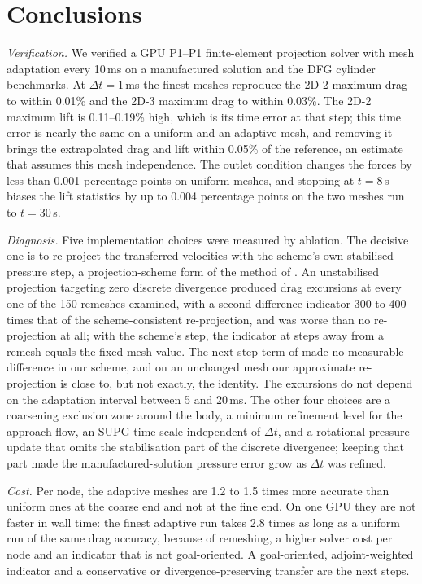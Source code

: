 \documentclass[preprint,12pt,number]{elsarticle}
\newcommand{\dt}{\Delta t}
\begin{document}
\section{Conclusions}
\label{sec:conclusions}

\emph{Verification.} We verified a GPU P1--P1 finite-element projection solver with mesh
adaptation every 10\,ms on a manufactured solution and the DFG cylinder benchmarks. At
$\dt = 1\,$ms the finest meshes reproduce the 2D-2 maximum drag to within 0.01\% and the 2D-3
maximum drag to within 0.03\%. The 2D-2 maximum lift is 0.11--0.19\% high, which is its time
error at that step; this time error is nearly the same on a uniform and an adaptive mesh, and
removing it brings the extrapolated drag and lift within 0.05\% of the reference, an estimate
that assumes this mesh independence. The outlet condition changes the forces by less than
0.001 percentage points on uniform meshes, and stopping at $t = 8\,$s biases the lift
statistics by up to 0.004 percentage points on the two meshes run to $t = 30\,$s.

\emph{Diagnosis.} Five implementation choices were measured by ablation. The decisive one is to
re-project the transferred velocities with the scheme's own stabilised pressure step, a
projection-scheme form of the method of \citet{braack2013}. An unstabilised projection
targeting zero discrete divergence produced drag excursions at every one of the 150 remeshes
examined, with a second-difference indicator 300 to 400 times that of the scheme-consistent
re-projection, and was worse than no re-projection at all; with the scheme's step, the indicator
at steps away from a remesh equals the fixed-mesh value. The next-step term of
\citet{braack2013} made no measurable difference in our scheme, and on an unchanged mesh our
approximate re-projection is close to, but not exactly, the identity. The excursions do not
depend on the adaptation interval between 5 and 20\,ms. The other four choices are a
coarsening exclusion zone around the body, a minimum refinement level for the approach flow, an
SUPG time scale independent of $\dt$, and a rotational pressure update that omits the
stabilisation part of the discrete divergence; keeping that part made the manufactured-solution
pressure error grow as $\dt$ was refined.

\emph{Cost.} Per node, the adaptive meshes are 1.2 to 1.5 times more accurate than uniform ones
at the coarse end and not at the fine end. On one GPU they are not faster in wall time: the
finest adaptive run takes 2.8 times as long as a uniform run of the same drag accuracy, because
of remeshing, a higher solver cost per node and an indicator that is not goal-oriented. A
goal-oriented, adjoint-weighted indicator and a conservative or divergence-preserving transfer
are the next steps.
\end{document}
